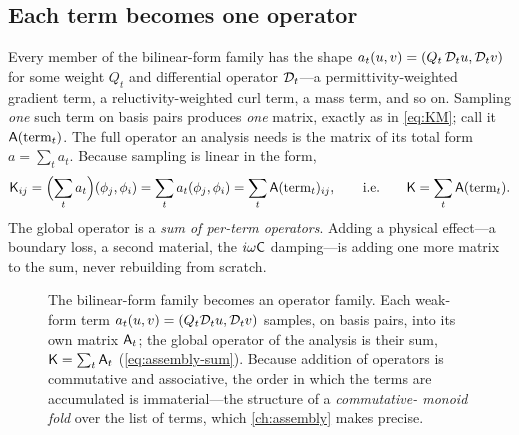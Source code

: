 \subsection{Each term becomes one operator}

Every member of the bilinear-form family has the shape
$a_t(u,v)=(Q_t\,\mathcal{D}_t u,\mathcal{D}_t v)$ for some weight $Q_t$ and differential
operator $\mathcal{D}_t$---a permittivity-weighted gradient term, a
reluctivity-weighted curl term, a mass term, and so on. Sampling \emph{one} such
term on basis pairs produces \emph{one} matrix, exactly as in \cref{eq:KM}; call
it $\mathsf{A}(\text{term}_t)$. The full operator an analysis needs is the matrix of
its total form $a=\sum_t a_t$. Because sampling is linear in the form,
\begin{equation}
\mathsf{K}_{ij}=\Bigl(\sum_t a_t\Bigr)(\phi_j,\phi_i)
=\sum_t a_t(\phi_j,\phi_i)
=\sum_t \mathsf{A}(\text{term}_t)_{ij},
\qquad\text{i.e.}\qquad
\mathsf{K}=\sum_t \mathsf{A}(\text{term}_t).
\label{eq:assembly-sum}
\end{equation}
The global operator is a \emph{sum of per-term operators}. Adding a physical
effect---a boundary loss, a second material, the $i\omega\mathsf{C}$ damping---is
adding one more matrix to the sum, never rebuilding from scratch.

\begin{figure}[t]
\centering
{}
\caption[Assembly as a sum of term-operators]{The bilinear-form family becomes an
operator family. Each weak-form term $a_t(u,v)=(Q_t\mathcal{D}_t u,\mathcal{D}_t v)$
samples, on basis pairs, into its own matrix $\mathsf{A}_t$; the global operator of
the analysis is their sum, $\mathsf{K}=\sum_t\mathsf{A}_t$ (\cref{eq:assembly-sum}).
Because addition of operators is commutative and associative, the order in which
the terms are accumulated is immaterial---the structure of a \emph{commutative-
monoid fold} over the list of terms, which \cref{ch:assembly} makes precise.}
\label{fig:assembly-sum}
\end{figure}

